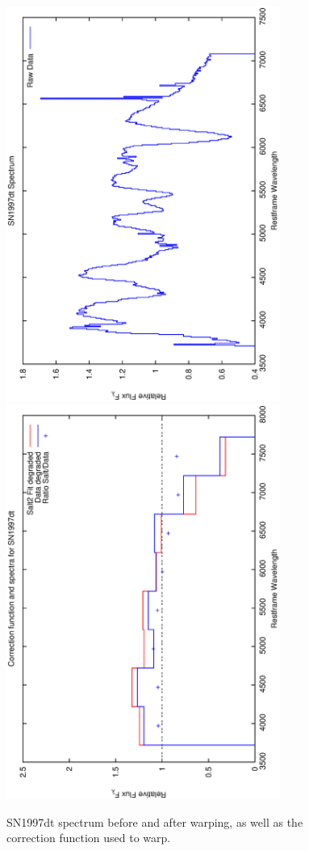 \begin{figure}[p]
\centering
\includegraphics[angle=-90,width=0.8\textwidth]{./figures/spectrabeforeafter/SN1997dt_handpicked_v001_v027_before_after_spectra.ps}
\hfill
\includegraphics[angle=-90,width=0.8\textwidth]{./figures/corrections/SN1997dt_v001_correction.ps}
\hfill
\caption{SN1997dt spectrum before and after warping, as well as the correction function used to warp.}
\label{fig:SN1997dtfour1}
\end{figure}

